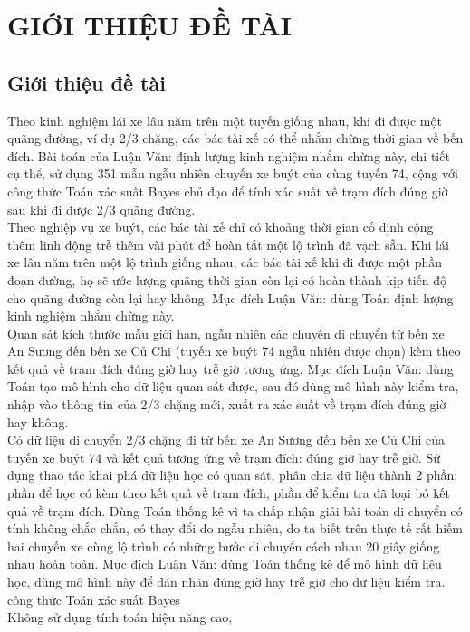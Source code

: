 \documentclass[a4paper, 13pt]{report}
\begin{document}
\chapter{GIỚI THIỆU ĐỀ TÀI} %
\section{Giới thiệu đề tài}
Theo kinh nghiệm lái xe lâu năm trên một tuyến giống nhau, khi đi được một quãng đường, ví dụ 2/3 chặng, các bác tài xế có thể nhắm chừng thời gian về bến đích. Bài toán của Luận Văn: định lượng kinh nghiệm nhắm chừng này, chi tiết cụ thể, sử dụng 351 mẫu ngẫu nhiên chuyến xe buýt của cùng tuyến 74, cộng với công thức Toán xác suất Bayes chủ đạo để tính xác suất về trạm đích đúng giờ sau khi đi được 2/3 quãng đường.\\
Theo nghiệp vụ xe buýt, các bác tài xế chỉ có khoảng thời gian cố định cộng thêm linh động trễ thêm vài phút để hoàn tất một lộ trình đã vạch sẵn. Khi lái xe lâu năm trên một lộ trình giống nhau, các bác tài xế khi đi được một phần đoạn đường, họ sẽ ước lượng quãng thời gian còn lại có hoàn thành kịp tiến độ cho quãng đường còn lại hay không. Mục đích Luận Văn: dùng Toán định lượng kinh nghiệm nhắm chừng này.\\
Quan sát kích thước mẫu giới hạn, ngẫu nhiên các chuyến di chuyển từ bến xe An Sương đến bến xe Củ Chi (tuyến xe buýt 74 ngẫu nhiên được chọn) kèm theo kết quả về trạm đích đúng giờ hay trễ giờ tương ứng. Mục đích Luận Văn: dùng Toán tạo mô hình cho dữ liệu quan sát được, sau đó dùng mô hình này kiểm tra, nhập vào thông tin của 2/3 chặng mới, xuất ra xác suất về trạm đích đúng giờ hay không.\\
Có dữ liệu di chuyển 2/3 chặng đi từ bến xe An Sương đến bến xe Củ Chi của tuyến xe buýt 74 và kết quả tương ứng về trạm đích: đúng giờ hay trễ giờ. Sử dụng thao tác khai phá dữ liệu học có quan sát, phân chia dữ liệu thành 2 phần: phần để học có kèm theo kết quả về trạm đích, phần để kiểm tra đã loại bỏ kết quả về trạm đích. Dùng Toán thống kê vì ta chấp nhận giải bài toán di chuyển có tính không chắc chắn, có thay đổi do ngẫu nhiên, do ta biết trên thực tế rất hiếm hai chuyến xe cùng lộ trình có những bước di chuyển cách nhau 20 giây giống nhau hoàn toàn. Mục đích Luận Văn: dùng Toán thống kê để mô hình dữ liệu học, dùng mô hình này để dán nhãn đúng giờ hay trễ giờ cho dữ liệu kiểm tra.\\
công thức Toán xác suất Bayes\\
Không sử dụng tính toán hiệu năng cao, 
\end{document}
